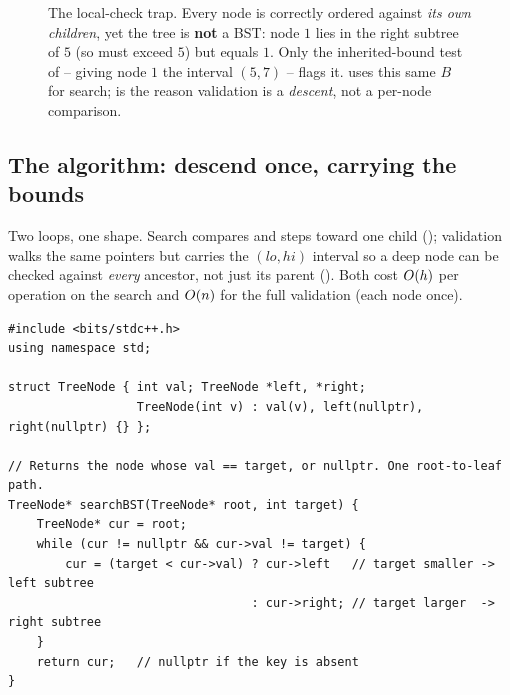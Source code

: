 \begin{figure}[H]
\centering
{}
\caption{The local-check trap. Every node is correctly ordered against \emph{its own children}, yet
the tree is \textbf{not} a BST: node $1$ lies in the right subtree of $5$ (so must exceed $5$) but
equals $1$. Only the inherited-bound test of  -- giving node $1$ the interval
$(5,7)$ -- flags it.  uses this same $B$ for search;  is the
reason validation is a \emph{descent}, not a per-node comparison.}\label{fig:c05-trap}
\end{figure}

\subsection{The algorithm: descend once, carrying the bounds}

Two loops, one shape. Search compares and steps toward one child ();
validation walks the same pointers but carries the $(\mathit{lo},\mathit{hi})$ interval so a deep
node can be checked against \emph{every} ancestor, not just its parent ().
Both cost $O(h)$ per operation on the search and $O(n)$ for the full validation (each node
once).

\begin{lstlisting}[caption={Search a BST for a value -- iterative one-descent (LeetCode 700)}, label={lst:c05-search}]
#include <bits/stdc++.h>
using namespace std;

struct TreeNode { int val; TreeNode *left, *right;
                  TreeNode(int v) : val(v), left(nullptr), right(nullptr) {} };

// Returns the node whose val == target, or nullptr. One root-to-leaf path.
TreeNode* searchBST(TreeNode* root, int target) {
    TreeNode* cur = root;
    while (cur != nullptr && cur->val != target) {
        cur = (target < cur->val) ? cur->left   // target smaller -> left subtree
                                  : cur->right; // target larger  -> right subtree
    }
    return cur;   // nullptr if the key is absent
}
\end{lstlisting}

